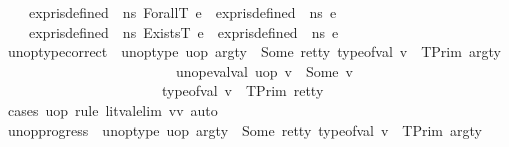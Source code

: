 \begin{isabellebody}
\ \ \ {\isacharbar}{\kern0pt}\ {\isachardoublequoteopen}expr{\isacharunderscore}{\kern0pt}is{\isacharunderscore}{\kern0pt}defined\ {\isasymLambda}\ ns\ {\isacharparenleft}{\kern0pt}ForallT\ e{\isacharparenright}{\kern0pt}\ {\isacharequal}{\kern0pt}\ expr{\isacharunderscore}{\kern0pt}is{\isacharunderscore}{\kern0pt}defined\ {\isasymLambda}\ ns\ e{\isachardoublequoteclose}\isanewline
\ \ \ {\isacharbar}{\kern0pt}\ {\isachardoublequoteopen}expr{\isacharunderscore}{\kern0pt}is{\isacharunderscore}{\kern0pt}defined\ {\isasymLambda}\ ns\ {\isacharparenleft}{\kern0pt}ExistsT\ e{\isacharparenright}{\kern0pt}\ {\isacharequal}{\kern0pt}\ expr{\isacharunderscore}{\kern0pt}is{\isacharunderscore}{\kern0pt}defined\ {\isasymLambda}\ ns\ e{\isachardoublequoteclose}\isanewline
\isanewline
{}\isamarkupfalse%
\ unop{\isacharunderscore}{\kern0pt}type{\isacharunderscore}{\kern0pt}correct{\isacharcolon}{\kern0pt}\ {\isachardoublequoteopen}{\isasymlbrakk}\ unop{\isacharunderscore}{\kern0pt}type\ uop\ arg{\isacharunderscore}{\kern0pt}ty\ {\isacharequal}{\kern0pt}\ Some\ ret{\isacharunderscore}{\kern0pt}ty{\isacharsemicolon}{\kern0pt}\ type{\isacharunderscore}{\kern0pt}of{\isacharunderscore}{\kern0pt}val\ v{\isacharprime}{\kern0pt}\ {\isacharequal}{\kern0pt}\ TPrim\ arg{\isacharunderscore}{\kern0pt}ty{\isacharsemicolon}{\kern0pt}\isanewline
\ \ \ \ \ \ \ \ \ \ \ \ \ \ \ \ \ \ \ \ \ \ \ \ \ {\isacharparenleft}{\kern0pt}unop{\isacharunderscore}{\kern0pt}eval{\isacharunderscore}{\kern0pt}val\ uop\ v{\isacharprime}{\kern0pt}{\isacharparenright}{\kern0pt}\ {\isacharequal}{\kern0pt}\ Some\ v\ \ {\isasymrbrakk}\ {\isasymLongrightarrow}\isanewline
\ \ \ \ \ \ \ \ \ \ \ \ \ \ \ \ \ \ \ \ \ \ \ type{\isacharunderscore}{\kern0pt}of{\isacharunderscore}{\kern0pt}val\ v\ {\isacharequal}{\kern0pt}\ TPrim\ ret{\isacharunderscore}{\kern0pt}ty{\isachardoublequoteclose}\isanewline
%
\isadelimproof
\ \ %
\endisadelimproof
%
\isatagproof
{}\isamarkupfalse%
\ {\isacharparenleft}{\kern0pt}cases\ uop{\isacharsemicolon}{\kern0pt}\ rule\ lit{\isacharunderscore}{\kern0pt}val{\isacharunderscore}{\kern0pt}elim{\isacharbrackleft}{\kern0pt}\ v{\isacharequal}{\kern0pt}v{\isacharprime}{\kern0pt}{\isacharbrackright}{\kern0pt}{\isacharsemicolon}{\kern0pt}\ auto{\isacharparenright}{\kern0pt}%
\endisatagproof
{\isafoldproof}%
%
\isadelimproof
\isanewline
%
\endisadelimproof
\isanewline
{}\isamarkupfalse%
\ unop{\isacharunderscore}{\kern0pt}progress{\isacharcolon}{\kern0pt}\ {\isachardoublequoteopen}{\isasymlbrakk}\ unop{\isacharunderscore}{\kern0pt}type\ uop\ arg{\isacharunderscore}{\kern0pt}ty\ {\isacharequal}{\kern0pt}\ Some\ ret{\isacharunderscore}{\kern0pt}ty{\isacharsemicolon}{\kern0pt}\ type{\isacharunderscore}{\kern0pt}of{\isacharunderscore}{\kern0pt}val\ v{\isacharprime}{\kern0pt}\ {\isacharequal}{\kern0pt}\ TPrim\ arg{\isacharunderscore}{\kern0pt}ty{\isasymrbrakk}\ {\isasymLongrightarrow}\isanewline

\end{isabellebody}
